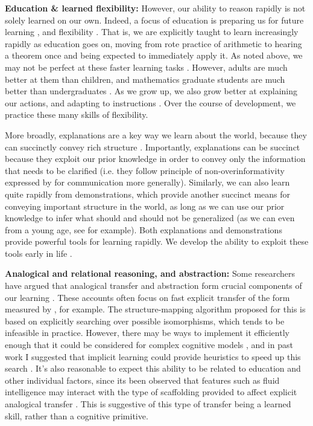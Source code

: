 \documentclass[11pt]{article}
\begin{document}
\textbf{Education \& learned flexibility:} However, our ability to reason rapidly is not solely learned on our own. Indeed, a focus of education is preparing us for future learning \citep{Bransford1999}, and flexibility \citep[e.g.]{Richland2012}. That is, we are explicitly taught to learn increasingly rapidly as education goes on, moving from rote practice of arithmetic to hearing a theorem once and being expected to immediately apply it. As noted above, we may not be perfect at these faster learning tasks \citep[e.g.]{Hazzan1999}. However, adults are much better at them than children, and mathematics graduate students are much better than undergraduates \citep{Weber2001}. As we grow up, we also grow better at explaining our actions, and adapting to instructions \citep[e.g.]{Doebel2015}. Over the course of development, we practice these many skills of flexibility. \par 
More broadly, explanations are a key way we learn about the world, because they can succinctly convey rich structure \citep[e.g.]{Keil2006, Lombrozo2006}. Importantly, explanations can be succinct because they exploit our prior knowledge in order to convey only the information that needs to be clarified (i.e. they follow principle of non-overinformativity expressed by \citet{Grice1975} for communication more generally). Similarly, we can also learn quite rapidly from demonstrations, which provide another succinct means for conveying important structure in the world, as long as we can use our prior knowledge to infer what should and should not be generalized (as we can even from a young age, see \citet{VanDamme2002} for example). Both explanations and demonstrations provide powerful tools for learning rapidly. We develop the ability to exploit these tools early in life \citep{Carpenter2005}. \par 
\textbf{Analogical and relational reasoning, and abstraction:} Some researchers have argued that analogical transfer and abstraction form crucial components of our learning \citep[e.g.]{Gentner2003, Gentner2017}. These accounts often focus on fast explicit transfer of the form measured by \citet{Gick1980}, for example. The structure-mapping algorithm \citep{Falkenhainer1989} proposed for this is based on explicitly searching over possible isomorphisms, which tends to be infeasible in practice. However, there may be ways to implement it efficiently enough that it could be considered for complex cognitive models \citep{Forbus2017}, and in past work I suggested that implicit learning could provide heuristics to speed up this search \citep{Lampinen2017a}. It's also reasonable to expect this ability to be related to education and other individual factors, since its been observed that features such as fluid intelligence may interact with the type of scaffolding provided to affect explicit analogical transfer \citep{Kubricht2017}. This is suggestive of this type of transfer being a learned skill, rather than a cognitive primitive. \par
\end{document}
